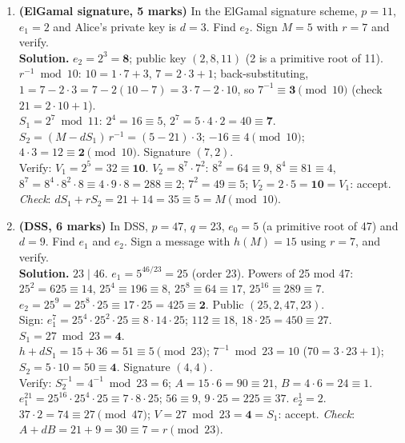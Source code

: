 \begin{enumerate}[leftmargin=1.6em,itemsep=4pt]
  \item \textbf{(ElGamal signature, 5 marks)} In the ElGamal signature scheme, $p = 11$, $e_1 = 2$ and Alice's private key is $d = 3$. Find $e_2$. Sign $M = 5$ with $r = 7$ and verify.\\
  \textbf{Solution.} $e_2 = 2^3 = \mathbf{8}$; public key $(2, 8, 11)$ (2 is a primitive root of 11).\\
  $r^{-1} \bmod 10$: $10 = 1 \cdot 7 + 3$, $7 = 2 \cdot 3 + 1$; back-substituting, $1 = 7 - 2 \cdot 3 = 7 - 2(10 - 7) = 3 \cdot 7 - 2 \cdot 10$, so $7^{-1} \equiv \mathbf{3} \pmod{10}$ (check $21 = 2 \cdot 10 + 1$).\\
  $S_1 = 2^7 \bmod 11$: $2^4 = 16 \equiv 5$, $2^7 = 5 \cdot 4 \cdot 2 = 40 \equiv \mathbf{7}$.\\
  $S_2 = (M - dS_1)\,r^{-1} = (5 - 21) \cdot 3$; $-16 \equiv 4 \pmod{10}$; $4 \cdot 3 = 12 \equiv \mathbf{2} \pmod{10}$. Signature $(7, 2)$.\\
  Verify: $V_1 = 2^5 = 32 \equiv \mathbf{10}$. $V_2 = 8^7 \cdot 7^2$: $8^2 = 64 \equiv 9$, $8^4 \equiv 81 \equiv 4$, $8^7 = 8^4 \cdot 8^2 \cdot 8 \equiv 4 \cdot 9 \cdot 8 = 288 \equiv 2$; $7^2 = 49 \equiv 5$; $V_2 = 2 \cdot 5 = \mathbf{10} = V_1$: accept. \emph{Check}: $dS_1 + rS_2 = 21 + 14 = 35 \equiv 5 = M \pmod{10}$.

  \item \textbf{(DSS, 6 marks)} In DSS, $p = 47$, $q = 23$, $e_0 = 5$ (a primitive root of 47) and $d = 9$. Find $e_1$ and $e_2$. Sign a message with $h(M) = 15$ using $r = 7$, and verify.\\
  \textbf{Solution.} $23 \mid 46$. $e_1 = 5^{46/23} = 25$ (order 23). Powers of 25 mod 47: $25^2 = 625 \equiv 14$, $25^4 \equiv 196 \equiv 8$, $25^8 \equiv 64 \equiv 17$, $25^{16} \equiv 289 \equiv 7$. $e_2 = 25^9 = 25^8 \cdot 25 \equiv 17 \cdot 25 = 425 \equiv \mathbf{2}$. Public $(25, 2, 47, 23)$.\\
  Sign: $e_1^7 = 25^4 \cdot 25^2 \cdot 25 \equiv 8 \cdot 14 \cdot 25$; $112 \equiv 18$, $18 \cdot 25 = 450 \equiv 27$. $S_1 = 27 \bmod 23 = \mathbf{4}$.\\
  $h + dS_1 = 15 + 36 = 51 \equiv 5 \pmod{23}$; $7^{-1} \bmod 23 = 10$ ($70 = 3 \cdot 23 + 1$); $S_2 = 5 \cdot 10 = 50 \equiv \mathbf{4}$. Signature $(4, 4)$.\\
  Verify: $S_2^{-1} = 4^{-1} \bmod 23 = 6$; $A = 15 \cdot 6 = 90 \equiv 21$, $B = 4 \cdot 6 = 24 \equiv 1$.\\
  $e_1^{21} = 25^{16} \cdot 25^4 \cdot 25 \equiv 7 \cdot 8 \cdot 25$; $56 \equiv 9$, $9 \cdot 25 = 225 \equiv 37$. $e_2^1 = 2$. $37 \cdot 2 = 74 \equiv 27 \pmod{47}$; $V = 27 \bmod 23 = \mathbf{4} = S_1$: accept. \emph{Check}: $A + dB = 21 + 9 = 30 \equiv 7 = r \pmod{23}$.


\end{enumerate}
